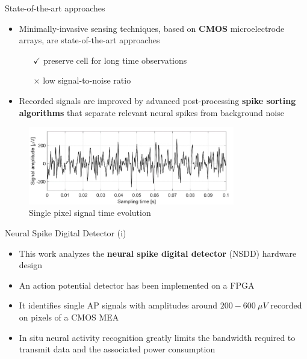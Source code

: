 \documentclass{beamer}
\begin{document}
\begin{frame}{State-of-the-art approaches}
\begin{itemize}
    \item Minimally-invasive sensing techniques, based on \textbf{CMOS} microelectrode arrays, are state-of-the-art approaches
    \begin{itemize}
        \item[$\checkmark$] preserve cell for long time observations
        \item[$\times$] low signal-to-noise ratio
    \end{itemize}
    \item Recorded signals are improved by advanced post-processing \textbf{spike sorting algorithms} that separate relevant neural spikes from background noise
\end{itemize}
\begin{figure}
    \centering     
    \vspace{-0.4cm}
    \includegraphics[width=9cm]{sig-noise.jpg}
    \vspace{-0.1cm}
    \caption{Single pixel signal time evolution}
\end{figure}
\end{frame}

\begin{frame}{Neural Spike Digital Detector (i)}
\begin{itemize}
    \item This work analyzes the \textbf{neural spike digital detector} (NSDD) hardware design
    \item An action potential detector has been implemented on a FPGA
    \item It identifies single AP signals with amplitudes around $200-600 \: \mu V$ recorded on pixels of a CMOS MEA
    \item In situ neural activity recognition greatly limits the bandwidth required to transmit data and the associated power consumption
\end{itemize}
\end{frame}
\end{document}
